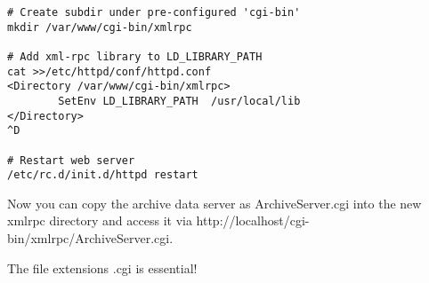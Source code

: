 \begin{lstlisting}
# Create subdir under pre-configured 'cgi-bin'
mkdir /var/www/cgi-bin/xmlrpc

# Add xml-rpc library to LD_LIBRARY_PATH
cat >>/etc/httpd/conf/httpd.conf
<Directory /var/www/cgi-bin/xmlrpc>
        SetEnv LD_LIBRARY_PATH  /usr/local/lib
</Directory>
^D

# Restart web server
/etc/rc.d/init.d/httpd restart
\end{lstlisting}


\noindent Now you can copy the archive data server as
ArchiveServer.cgi into the new xmlrpc directory and access it via
http://localhost/cgi-bin/xmlrpc/ArchiveServer.cgi.

\NOTE The file extensions .cgi is essential!

